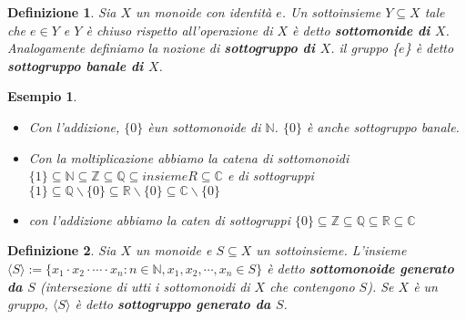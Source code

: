\documentclass[a4paper,12pt]{article}
\theoremstyle{def}
\newtheorem*{definition}{Definizione}
\theoremstyle{prop}
\theoremstyle{esempio}
\newtheorem*{example}{Esempio}
\theoremstyle{dimostrazione}
\theoremstyle{teo}
\theoremstyle{osservazione}
\begin{document}
\begin{definition}
	Sia \(X\) un monoide con identità \(e\). Un sottoinsieme \(Y \subseteq X\) tale che \(e \in Y\) e \(Y\)
	è chiuso rispetto all'operazione di \(X\) è detto \textbf{sottomonide di \(X\)}. Analogamente definiamo
	la nozione di \textbf{sottogruppo di \(X\)}. il gruppo \{\(e\)\} è detto \textbf{sottogruppo banale di \(X\)}.
\end{definition}

\begin{example}
	\
	\begin{itemize}
		\item Con l'addizione, \(\{0\}\) èun sottomonoide di \(\mathbb{N}\). \(\{0\}\) è anche sottogruppo banale.
		\item Con la moltiplicazione abbiamo la catena di sottomonoidi \(\{1\} \subseteq \mathbb{N} \subseteq
		      \mathbb{Z} \subseteq \mathbb{Q} \subseteq insieme R \subseteq  \mathbb{C}\) e di sottogruppi \(\{1\}
		      \subseteq \mathbb{Q}\backslash \{0\} \subseteq \mathbb{R} \backslash \{0\} \subseteq \mathbb{C}
		      \backslash \{0\}\)
		\item con l'addizione abbiamo la caten di sottogruppi \(\{0\} \subseteq \mathbb{Z} \subseteq \mathbb{Q}
		      \subseteq \mathbb{R} \subseteq \mathbb{C}\)
	\end{itemize}
\end{example}

\begin{definition}
	Sia \(X\) un monoide e \(S \subseteq X\) un sottoinsieme. L'insieme \(\langle S \rangle := \{ x_1
	\cdot x_2 \cdot \cdots \cdot x_n : n \in \mathbb{N}, x_1,x_2,\cdots,x_n \in S \}\) è detto
	\textbf{sottomonoide generato da \(S\)} (intersezione di utti i sottomonoidi di \(X\) che contengono
	\(S\)). Se \(X\) è un gruppo, \(\langle S \rangle\) è detto \textbf{sottogruppo generato da \(S\)}.
\end{definition}
\end{document}
